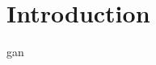 \chapter{Introduction}
\label{sec:introduction}



\todo[inline]{}

\acrfull{gan} \cite{goodfellow2014gan} \cite{goodfellow2020gan}